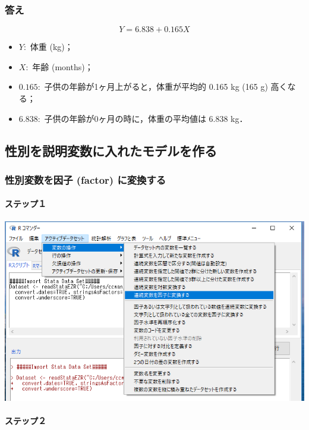 \documentclass[11pt,]{problemset}
\providecommand{\tightlist}{%
  \setlength{\itemsep}{0pt}\setlength{\parskip}{0pt}}
\let\oldparagraph\paragraph
\renewcommand{\paragraph}[1]{\oldparagraph{#1}\mbox{}}
\begin{document}
\hypertarget{-3}{%
\subsubsection{答え}\label{-3}}

\[
Y = 6.838 + 0.165 X
\]

\begin{itemize}
\tightlist
\item
  \(Y:\) 体重 (kg)；
\item
  \(X:\) 年齢 (months)；
\item
  \(0.165:\) 子供の年齢が1ヶ月上がると，体重が平均的 0.165 kg (165 g)
  高くなる；
\item
  \(6.838:\) 子供の年齢が0ヶ月の時に，体重の平均値は 6.838 kg．
\end{itemize}

\subsection{性別を説明変数に入れたモデルを作る}

\hypertarget{-factor-}{%
\subsubsection{性別変数を因子 (factor) に変換する}\label{-factor-}}

\hypertarget{-8}{%
\paragraph{ステップ１}\label{-8}}

\begin{center}\includegraphics[width=0.8\linewidth]{pic/sexfactor00} \end{center}

\hypertarget{-9}{%
\paragraph{ステップ２}\label{-9}}
\end{document}
